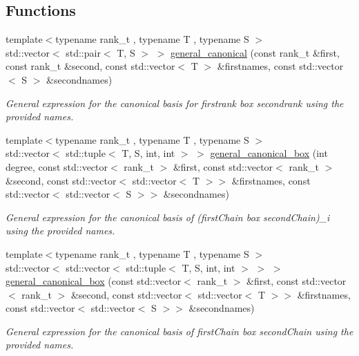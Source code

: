 \subsection*{Functions}
\begin{DoxyCompactItemize}
\item 
{\footnotesize template$<$typename rank\+\_\+t , typename T , typename S $>$ }\\std\+::vector$<$ std\+::pair$<$ T, S $>$ $>$ \hyperlink{namespaceMackey_1_1internal_a34dd271be1fcbda4ca21877094697796}{general\+\_\+canonical} (const rank\+\_\+t \&first, const rank\+\_\+t \&second, const std\+::vector$<$ T $>$ \&firstnames, const std\+::vector$<$ S $>$ \&secondnames)
\begin{DoxyCompactList}\small\item\em General expression for the canonical basis for firstrank box secondrank using the provided names. \end{DoxyCompactList}\item 
{\footnotesize template$<$typename rank\+\_\+t , typename T , typename S $>$ }\\std\+::vector$<$ std\+::tuple$<$ T, S, int, int $>$ $>$ \hyperlink{namespaceMackey_1_1internal_a2c420c10c78dcc4f9ae579bad1cd2e45}{general\+\_\+canonical\+\_\+box} (int degree, const std\+::vector$<$ rank\+\_\+t $>$ \&first, const std\+::vector$<$ rank\+\_\+t $>$ \&second, const std\+::vector$<$ std\+::vector$<$ T $>$$>$ \&firstnames, const std\+::vector$<$ std\+::vector$<$ S $>$$>$ \&secondnames)
\begin{DoxyCompactList}\small\item\em General expression for the canonical basis of (first\+Chain box second\+Chain)\+\_\+i using the provided names. \end{DoxyCompactList}\item 
{\footnotesize template$<$typename rank\+\_\+t , typename T , typename S $>$ }\\std\+::vector$<$ std\+::vector$<$ std\+::tuple$<$ T, S, int, int $>$ $>$ $>$ \hyperlink{namespaceMackey_1_1internal_a780adcafc5fe040d6340557f88f052f2}{general\+\_\+canonical\+\_\+box} (const std\+::vector$<$ rank\+\_\+t $>$ \&first, const std\+::vector$<$ rank\+\_\+t $>$ \&second, const std\+::vector$<$ std\+::vector$<$ T $>$$>$ \&firstnames, const std\+::vector$<$ std\+::vector$<$ S $>$$>$ \&secondnames)
\begin{DoxyCompactList}\small\item\em General expression for the canonical basis of first\+Chain box second\+Chain using the provided names. \end{DoxyCompactList}\item 

\end{DoxyCompactItemize}
